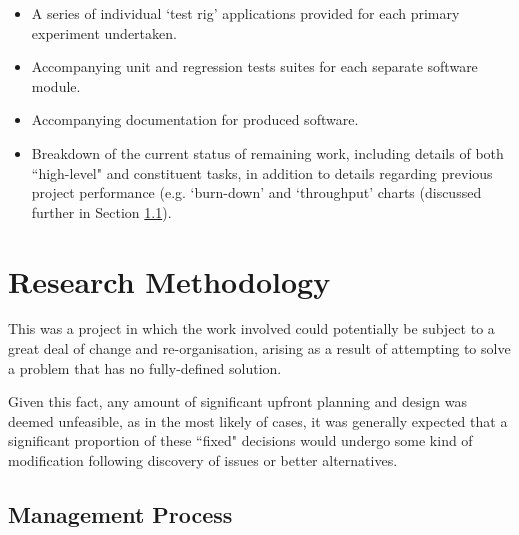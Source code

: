 \begin{itemize}
	\item A series of individual `test rig' applications provided for each primary experiment undertaken.
	\item Accompanying unit and regression tests suites for each separate software module.
	\item Accompanying documentation for produced software.
	\item Breakdown of the current status of remaining work, including details of both ``high-level" and constituent tasks, in addition to details regarding previous project performance (e.g. `burn-down' and `throughput' charts (discussed further in Section \ref{mgmt}).
\end{itemize}
  

%
%



\section{Research Methodology}

This was a project in which the work involved could potentially be subject to a great deal of change and re-organisation, arising as a result of attempting to solve a problem that has no fully-defined solution. 

Given this fact, any amount of significant upfront planning and design was deemed unfeasible, as in the most likely of cases, it was generally expected that a significant proportion of these ``fixed" decisions would undergo some kind of modification following discovery of issues or better alternatives.


\subsection{Management Process}
\label{mgmt}

